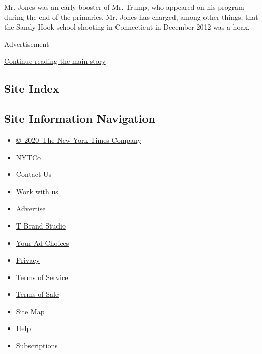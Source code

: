 Mr. Jones was an early booster of Mr. Trump, who appeared on his program
during the end of the primaries. Mr. Jones has charged, among other
things, that the Sandy Hook school shooting in Connecticut in December
2012 was a hoax.

\begin{quote}
\end{quote}

Advertisement

\protect\hyperlink{after-bottom}{Continue reading the main story}

\hypertarget{site-index}{%
\subsection{Site Index}\label{site-index}}

\hypertarget{site-information-navigation}{%
\subsection{Site Information
Navigation}\label{site-information-navigation}}

\begin{itemize}
\tightlist
\item
  \href{https://help.nytimes.com/hc/en-us/articles/115014792127-Copyright-notice}{©~2020~The
  New York Times Company}
\end{itemize}

\begin{itemize}
\tightlist
\item
  \href{https://www.nytco.com/}{NYTCo}
\item
  \href{https://help.nytimes.com/hc/en-us/articles/115015385887-Contact-Us}{Contact
  Us}
\item
  \href{https://www.nytco.com/careers/}{Work with us}
\item
  \href{https://nytmediakit.com/}{Advertise}
\item
  \href{http://www.tbrandstudio.com/}{T Brand Studio}
\item
  \href{https://www.nytimes.com/privacy/cookie-policy\#how-do-i-manage-trackers}{Your
  Ad Choices}
\item
  \href{https://www.nytimes.com/privacy}{Privacy}
\item
  \href{https://help.nytimes.com/hc/en-us/articles/115014893428-Terms-of-service}{Terms
  of Service}
\item
  \href{https://help.nytimes.com/hc/en-us/articles/115014893968-Terms-of-sale}{Terms
  of Sale}
\item
  \href{https://spiderbites.nytimes.com}{Site Map}
\item
  \href{https://help.nytimes.com/hc/en-us}{Help}
\item
  \href{https://www.nytimes.com/subscription?campaignId=37WXW}{Subscriptions}
\end{itemize}
